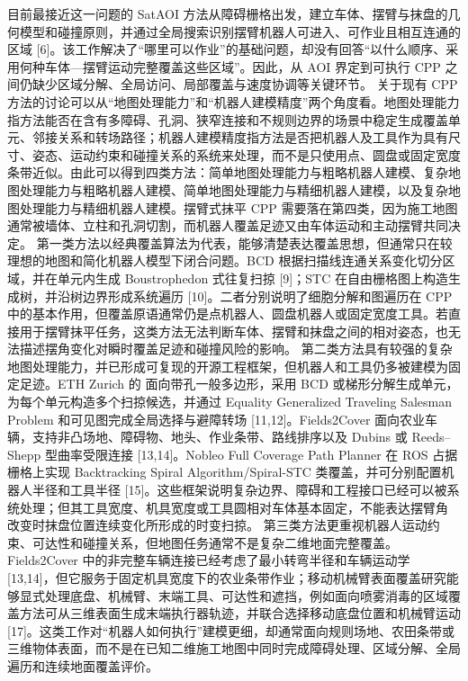 {}目前最接近这一问题的 SatAOI 方法从障碍栅格出发，建立车体、摆臂与抹盘的几何模型和碰撞原则，并通过全局搜索识别摆臂机器人可进入、可作业且相互连通的区域 [6]。该工作解决了“哪里可以作业”的基础问题，却没有回答“以什么顺序、采用何种车体—摆臂运动完整覆盖这些区域”。因此，从 AOI 界定到可执行 CPP 之间仍缺少区域分解、全局访问、局部覆盖与速度协调等关键环节。\markdownRendererParagraphSeparator
{}
\markdownRendererSectionEnd \markdownRendererSectionBegin
{}\markdownRendererParagraphSeparator
{}关于现有 CPP 方法的讨论可以从“地图处理能力”和“机器人建模精度”两个角度看。地图处理能力指方法能否在含有多障碍、孔洞、狭窄连接和不规则边界的场景中稳定生成覆盖单元、邻接关系和转场路径；机器人建模精度指方法是否把机器人及工具作为具有尺寸、姿态、运动约束和碰撞关系的系统来处理，而不是只使用点、圆盘或固定宽度条带近似。由此可以得到四类方法：简单地图处理能力与粗略机器人建模、复杂地图处理能力与粗略机器人建模、简单地图处理能力与精细机器人建模，以及复杂地图处理能力与精细机器人建模。摆臂式抹平 CPP 需要落在第四类，因为施工地图通常被墙体、立柱和孔洞切割，而机器人覆盖足迹又由车体运动和主动摆臂共同决定。\markdownRendererParagraphSeparator
{}第一类方法以经典覆盖算法为代表，能够清楚表达覆盖思想，但通常只在较理想的地图和简化机器人模型下闭合问题。BCD 根据扫描线连通关系变化切分区域，并在单元内生成 Boustrophedon 式往复扫掠 [9]；STC 在自由栅格图上构造生成树，并沿树边界形成系统遍历 [10]。二者分别说明了细胞分解和图遍历在 CPP 中的基本作用，但覆盖原语通常仍是点机器人、圆盘机器人或固定宽度工具。若直接用于摆臂抹平任务，这类方法无法判断车体、摆臂和抹盘之间的相对姿态，也无法描述摆角变化对瞬时覆盖足迹和碰撞风险的影响。\markdownRendererParagraphSeparator
{}第二类方法具有较强的复杂地图处理能力，并已形成可复现的开源工程框架，但机器人和工具仍多被建模为固定足迹。ETH Zurich 的  面向带孔一般多边形，采用 BCD 或梯形分解生成单元，为每个单元构造多个扫掠候选，并通过 Equality Generalized Traveling Salesman Problem 和可见图完成全局选择与避障转场 [11,12]。Fields2Cover 面向农业车辆，支持非凸场地、障碍物、地头、作业条带、路线排序以及 Dubins 或 Reeds–Shepp 型曲率受限连接 [13,14]。Nobleo Full Coverage Path Planner 在 ROS 占据栅格上实现 Backtracking Spiral Algorithm/Spiral-STC 类覆盖，并可分别配置机器人半径和工具半径 [15]。这些框架说明复杂边界、障碍和工程接口已经可以被系统处理；但其工具宽度、机具宽度或工具圆相对车体基本固定，不能表达摆臂角 \markdownRendererInlineMath{\phi} 改变时抹盘位置连续变化所形成的时变扫掠。\markdownRendererParagraphSeparator
{}第三类方法更重视机器人运动约束、可达性和碰撞关系，但地图任务通常不是复杂二维地面完整覆盖。Fields2Cover 中的非完整车辆连接已经考虑了最小转弯半径和车辆运动学 [13,14]，但它服务于固定机具宽度下的农业条带作业；移动机械臂表面覆盖研究能够显式处理底盘、机械臂、末端工具、可达性和遮挡，例如面向喷雾消毒的区域覆盖方法可从三维表面生成末端执行器轨迹，并联合选择移动底盘位置和机械臂运动 [17]。这类工作对“机器人如何执行”建模更细，却通常面向规则场地、农田条带或三维物体表面，而不是在已知二维施工地图中同时完成障碍处理、区域分解、全局遍历和连续地面覆盖评价。\markdownRendererParagraphSeparator
